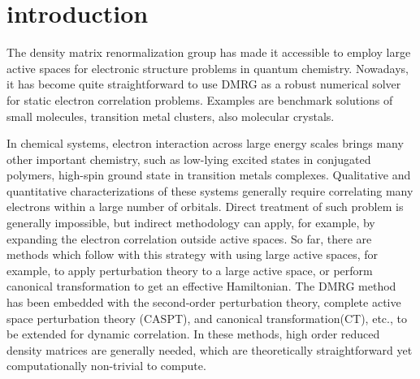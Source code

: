 
\section{introduction}

The density matrix renormalization group \cite{white_density_1992,white_density-matrix_1993} has made it accessible to employ large active spaces 
for electronic structure problems in quantum chemistry. Nowadays, it has become quite straightforward to use DMRG as a robust numerical solver for 
static electron correlation problems. Examples are benchmark solutions of small molecules\cite{chan_highly_2002}, transition metal 
clusters\cite{sharma_low-energy_2014, olivares-amaya_ab-initio_2015}, also molecular crystals\cite{yang_ab_2014}. 

In chemical systems, electron interaction across large energy scales brings many other important chemistry, such as low-lying excited states in 
conjugated polymers, high-spin ground state in transition metals complexes. Qualitative and quantitative characterizations of 
these systems generally require correlating many electrons within a large number of orbitals. Direct treatment of such problem is generally 
impossible, but indirect methodology can apply, for example, by expanding the electron correlation outside active spaces. So far, there are 
methods which follow with this strategy with using large active spaces, for example, to apply perturbation theory to a large active space, or 
perform canonical transformation to get an effective Hamiltonian.
The DMRG method has been embedded with the second-order perturbation theory\cite{kurashige_second-order_2011, sharma_communication:_2014}, 
complete active space perturbation theory (CASPT), and canonical transformation(CT)\cite{neuscamman_review_2010}, etc., to be extended for dynamic correlation. In these methods, high order reduced density matrices are generally needed, which are theoretically straightforward yet computationally non-trivial to compute.

